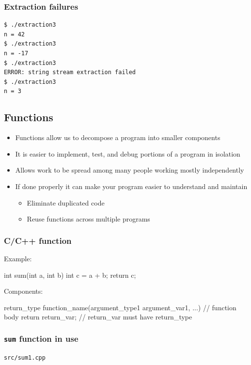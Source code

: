 \documentclass[12pt,letterpaper,twoside]{article}
\begin{document}
\subsubsection{Extraction failures}
\begin{verbatim}
$ ./extraction3
n = 42
$ ./extraction3
n = -17
$ ./extraction3
ERROR: string stream extraction failed
$ ./extraction3
n = 3
\end{verbatim}





\subsection{Functions}
\begin{itemize}
\item
  Functions allow us to decompose a program into smaller components
\item
  It is easier to implement, test, and debug portions of a program in
  isolation
\item
  Allows work to be spread among many people working mostly
  independently
\item
  If done properly it can make your program easier to understand and
  maintain

  \begin{itemize}
  \item
    Eliminate duplicated code
  \item
    Reuse functions across multiple programs
  \end{itemize}
\end{itemize}

\subsubsection{C/C++ function}
Example:

\begin{cpp}
int sum(int a, int b) {
  int c = a + b;
  return c;
}
\end{cpp}

Components:

\begin{cpp}
return_type function_name(argument_type1 argument_var1, ...) {
   // function body
   return return_var; // return_var must have return_type
}
\end{cpp}

\subsubsection{\texorpdfstring{\texttt{sum} function in use}{sum function in use}}
\texttt{src/sum1.cpp}
\end{document}
